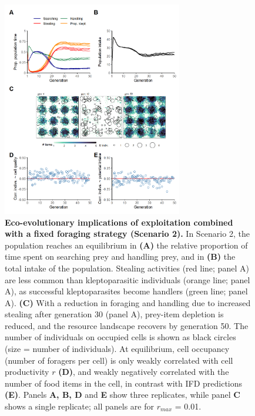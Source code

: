 \documentclass[11pt]{article}
\begin{document}
\begin{figure}[h!]
    \centering
    \includegraphics[width=0.70\textwidth]{figures/fig_02.png}
    \caption{
        \textbf{Eco-evolutionary implications of exploitation combined with a fixed foraging strategy (Scenario 2).}
        In Scenario 2, the population reaches an equilibrium in \textbf{(A)} the relative proportion of time spent on searching prey and handling prey, and in \textbf{(B)} the total intake of the population.
        Stealing activities (red line; panel A) are less common than kleptoparasitic individuals (orange line; panel A), as successful kleptoparasites become handlers (green line; panel A).
        \textbf{(C)} With a reduction in foraging and handling due to increased stealing after generation 30 (panel A), prey-item depletion is reduced, and the resource landscape recovers by generation 50.
        The number of individuals on occupied cells is shown as black circles (size = number of individuals). 
        At equilibrium, cell occupancy (number of foragers per cell) is only weakly correlated with cell productivity $r$ \textbf{(D)}, and weakly negatively correlated with the number of food items in the cell, in contrast with IFD predictions \textbf{(E)}.
        Panels \textbf{A, B, D} and \textbf{E} show three replicates, while panel \textbf{C} shows a single replicate; all panels are for $r_{max}$ = 0.01.
    }
    \label{Fig:Model2}
\end{figure}
\end{document}
